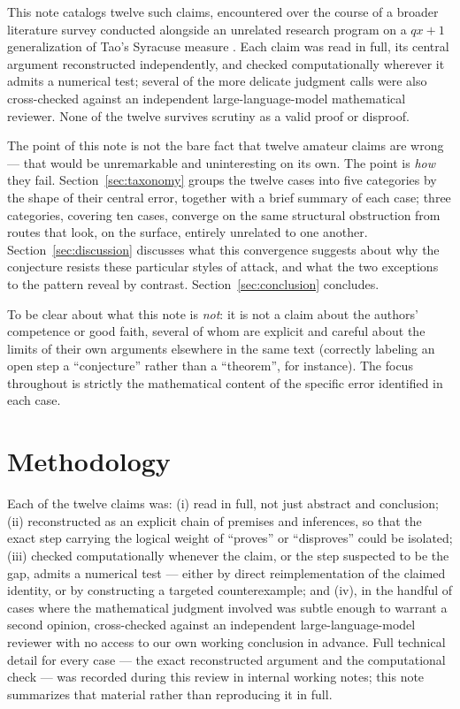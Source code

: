 \documentclass[11pt]{article}
\begin{document}
This note catalogs twelve such claims, encountered over the course of
a broader literature survey conducted alongside an unrelated research
program on a $qx+1$ generalization of Tao's Syracuse measure
\cite{Tao2022}. Each claim was read in full, its central argument
reconstructed independently, and checked computationally wherever it
admits a numerical test; several of the more delicate judgment calls
were also cross-checked against an independent large-language-model
mathematical reviewer. None of the twelve survives scrutiny as a valid
proof or disproof.

The point of this note is not the bare fact that twelve amateur claims
are wrong --- that would be unremarkable and uninteresting on its own.
The point is \emph{how} they fail. Section~\ref{sec:taxonomy} groups
the twelve cases into five categories by the shape of their central
error, together with a brief summary of each case; three categories,
covering ten cases, converge on the same structural obstruction from
routes that look, on the surface, entirely unrelated to one another.
Section~\ref{sec:discussion} discusses what this convergence suggests
about why the conjecture resists these particular styles of attack,
and what the two exceptions to the pattern reveal by contrast.
Section~\ref{sec:conclusion} concludes.

To be clear about what this note is \emph{not}: it is not a claim
about the authors' competence or good faith, several of whom are
explicit and careful about the limits of their own arguments elsewhere
in the same text (correctly labeling an open step a ``conjecture''
rather than a ``theorem'', for instance). The focus throughout is
strictly the mathematical content of the specific error identified in
each case.

\section{Methodology}
\label{sec:methodology}

Each of the twelve claims was: (i) read in full, not just abstract and
conclusion; (ii) reconstructed as an explicit chain of premises and
inferences, so that the exact step carrying the logical weight of
``proves'' or ``disproves'' could be isolated; (iii) checked
computationally whenever the claim, or the step suspected to be the
gap, admits a numerical test --- either by direct reimplementation of
the claimed identity, or by constructing a targeted counterexample; and
(iv), in the handful of cases where the mathematical judgment involved
was subtle enough to warrant a second opinion, cross-checked against an
independent large-language-model reviewer with no access to our own
working conclusion in advance. Full technical detail for every case ---
the exact reconstructed argument and the computational check --- was
recorded during this review in internal working notes; this note
summarizes that material rather than reproducing it in full.
\end{document}
